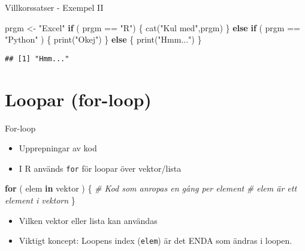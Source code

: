 \documentclass[
  11pt,
  ignorenonframetext,
]{beamer}
\newenvironment{Shaded}{\begin{snugshade}}{\end{snugshade}}
\newcommand{\CommentTok}[1]{\textcolor[rgb]{0.56,0.35,0.01}{\textit{#1}}}
\newcommand{\ControlFlowTok}[1]{\textcolor[rgb]{0.13,0.29,0.53}{\textbf{#1}}}
\newcommand{\FunctionTok}[1]{\textcolor[rgb]{0.00,0.00,0.00}{#1}}
\newcommand{\NormalTok}[1]{#1}
\newcommand{\OtherTok}[1]{\textcolor[rgb]{0.56,0.35,0.01}{#1}}
\newcommand{\SpecialCharTok}[1]{\textcolor[rgb]{0.00,0.00,0.00}{#1}}
\newcommand{\StringTok}[1]{\textcolor[rgb]{0.31,0.60,0.02}{#1}}
\providecommand{\tightlist}{%
  \setlength{\itemsep}{0pt}\setlength{\parskip}{0pt}}
\begin{document}

\begin{frame}[fragile]{Villkorssatser - Exempel II}
\protect\hypertarget{villkorssatser---exempel-ii}{}
\begin{Shaded}
\begin{Highlighting}[]
\NormalTok{prgm }\OtherTok{\textless{}{-}} \StringTok{"Excel"}
\ControlFlowTok{if}\NormalTok{ ( prgm }\SpecialCharTok{==} \StringTok{"R"}\NormalTok{) \{ }
  \FunctionTok{cat}\NormalTok{(}\StringTok{"Kul med"}\NormalTok{,prgm)}
\NormalTok{\} }\ControlFlowTok{else} \ControlFlowTok{if}\NormalTok{ ( prgm }\SpecialCharTok{==} \StringTok{"Python"}\NormalTok{ ) \{}
  \FunctionTok{print}\NormalTok{(}\StringTok{"Okej"}\NormalTok{)}
\NormalTok{\} }\ControlFlowTok{else}\NormalTok{ \{}
  \FunctionTok{print}\NormalTok{(}\StringTok{"Hmm..."}\NormalTok{)}
\NormalTok{\}}
\end{Highlighting}
\end{Shaded}

\pause

\begin{verbatim}
## [1] "Hmm..."
\end{verbatim}
\end{frame}

\hypertarget{loopar-for-loop}{%
\section{Loopar (for-loop)}\label{loopar-for-loop}}


\begin{frame}[fragile]{For-loop}
\protect\hypertarget{for-loop}{}
\begin{itemize}
\tightlist
\item
  Upprepningar av kod
\item
  I R används \texttt{for} för loopar över vektor/lista
\end{itemize}

\begin{Shaded}
\begin{Highlighting}[]
\ControlFlowTok{for}\NormalTok{ ( elem }\ControlFlowTok{in}\NormalTok{ vektor ) \{}
  \CommentTok{\# Kod som anropas en gång per element}
  \CommentTok{\# elem är ett element i vektorn}
\NormalTok{\}}
\end{Highlighting}
\end{Shaded}

\begin{itemize}
\tightlist
\item
  Vilken vektor eller lista kan användas
\item
  Viktigt koncept: Loopens index (\texttt{elem}) är det ENDA som ändras
  i loopen.
\end{itemize}
\end{frame}
\end{document}

